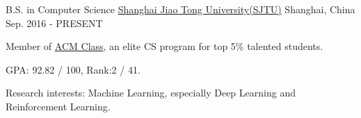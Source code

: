 \begin{cventries}
	\cventry
	{B.S. in Computer Science}
	{\href{http://en.sjtu.edu.cn/}{Shanghai Jiao Tong University(SJTU)}}
	{Shanghai, China}
	{Sep. 2016 - PRESENT}
	{
		\begin{cvitems}
			\item {Member of \href{https://acm.sjtu.edu.cn}{ACM Class}, an elite CS program for top 5\% talented students.}
            \item {GPA: 92.82 / 100, Rank:2 / 41.}
            \item {Research interests: Machine Learning, especially Deep Learning and Reinforcement Learning.}
		\end{cvitems}
	}
\end{cventries}
